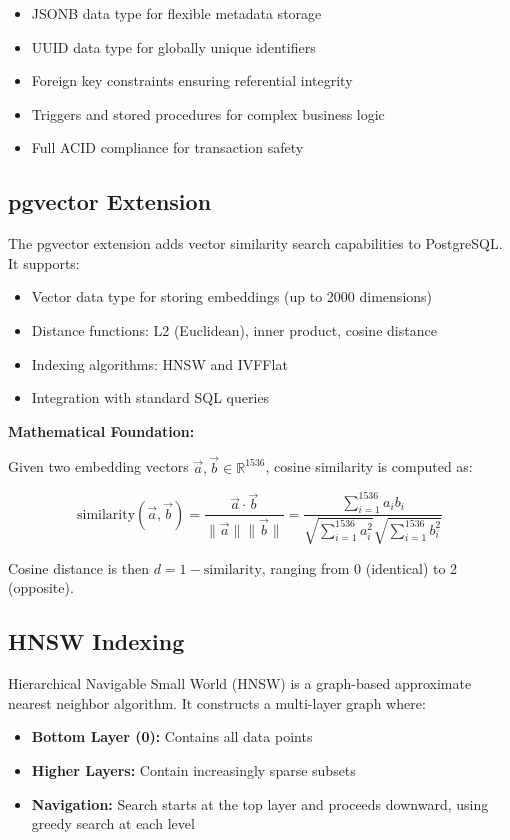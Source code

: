 \documentclass[12pt]{report}
\begin{document}
\begin{itemize}
    \item JSONB data type for flexible metadata storage
    \item UUID data type for globally unique identifiers
    \item Foreign key constraints ensuring referential integrity
    \item Triggers and stored procedures for complex business logic
    \item Full ACID compliance for transaction safety
\end{itemize}

\subsection{pgvector Extension}

The pgvector extension adds vector similarity search capabilities to PostgreSQL. It supports:

\begin{itemize}
    \item Vector data type for storing embeddings (up to 2000 dimensions)
    \item Distance functions: L2 (Euclidean), inner product, cosine distance
    \item Indexing algorithms: HNSW and IVFFlat
    \item Integration with standard SQL queries
\end{itemize}

\textbf{Mathematical Foundation:}

Given two embedding vectors $\vec{a}, \vec{b} \in \mathbb{R}^{1536}$, cosine similarity is computed as:

$$
\text{similarity}(\vec{a}, \vec{b}) = \frac{\vec{a} \cdot \vec{b}}{\|\vec{a}\| \|\vec{b}\|} = \frac{\sum_{i=1}^{1536} a_i b_i}{\sqrt{\sum_{i=1}^{1536} a_i^2} \sqrt{\sum_{i=1}^{1536} b_i^2}}
$$

Cosine distance is then $d = 1 - \text{similarity}$, ranging from 0 (identical) to 2 (opposite).

\subsection{HNSW Indexing}

Hierarchical Navigable Small World (HNSW) is a graph-based approximate nearest neighbor algorithm. It constructs a multi-layer graph where:

\begin{itemize}
    \item \textbf{Bottom Layer (0):} Contains all data points
    \item \textbf{Higher Layers:} Contain increasingly sparse subsets
    \item \textbf{Navigation:} Search starts at the top layer and proceeds downward, using greedy search at each level
\end{itemize}
\end{document}
